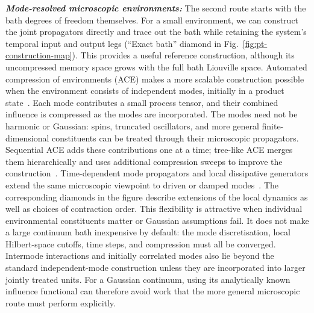 \textbf{\emph{Mode-resolved microscopic environments:}}
The second route starts with the bath degrees of freedom themselves.
For a small environment, we can construct the joint propagators directly and trace out the bath while retaining the system's temporal input and output legs (``Exact bath'' diamond in Fig.~\ref{fig:pt-construction-map}).
This provides a useful reference construction, although its uncompressed memory space grows with the full bath Liouville space.
Automated compression of environments (ACE) makes a more scalable construction possible when the environment consists of independent modes, initially in a product state~\cite{Cygorek2022}.
Each mode contributes a small process tensor, and their combined influence is compressed as the modes are incorporated.
The modes need not be harmonic or Gaussian: spins, truncated oscillators, and more general finite-dimensional constituents can be treated through their microscopic propagators.
Sequential ACE adds these contributions one at a time; tree-like ACE merges them hierarchically and uses additional compression sweeps to improve the construction~\cite{Cygorek2024Treelike}.
Time-dependent mode propagators and local dissipative generators extend the same microscopic viewpoint to driven or damped modes~\cite{Cygorek2022,CygorekGauger2024}.
The corresponding diamonds in the figure describe extensions of the local dynamics as well as choices of contraction order.
This flexibility is attractive when individual environmental constituents matter or Gaussian assumptions fail.
It does not make a large continuum bath inexpensive by default: the mode discretisation, local Hilbert-space cutoffs, time steps, and compression must all be converged.
Intermode interactions and initially correlated modes also lie beyond the standard independent-mode construction unless they are incorporated into larger jointly treated units.
For a Gaussian continuum, using its analytically known influence functional can therefore avoid work that the more general microscopic route must perform explicitly.

